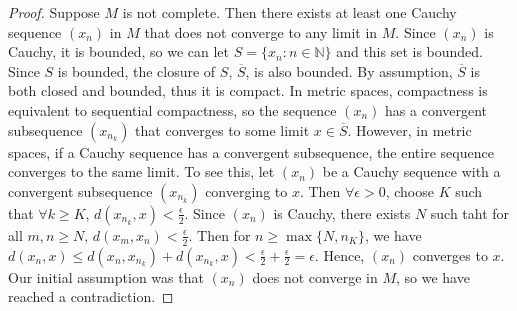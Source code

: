 \documentclass[12pt]{article}
\newcommand{\bbN}{\mathbb{N}}
\renewcommand{\_}[1]{\underline{ #1 }}
\theoremstyle{definition}
\newenvironment{exercise}[1]
  {\renewcommand\theinnercustomthm{#1}\innercustomthm}
  {\endinnercustomthm}
\numberwithin{equation}{subsection}
\begin{document}
\begin{exercise}{22}
    \begin{proof}
        Suppose $M$ is not complete. Then there exists at least one Cauchy sequence $(x_n)$ in $M$ that does not converge to any limit in $M$. Since $(x_n)$ is Cauchy, it is bounded, so we can let $S = \{ x_n : n \in \bbN \}$ and this set is bounded. Since $S$ is bounded, the closure of $S$, $\overline{S}$, is also bounded. By assumption, $\overline{S}$ is both closed and bounded, thus it is compact. In metric spaces, compactness is equivalent to sequential compactness, so the sequence $(x_n)$ has a convergent subsequence $(x_{n_k})$ that converges to some limit $x \in \overline{S}$. However, in metric spaces, if a Cauchy sequence has a convergent subsequence, the entire sequence converges to the same limit. To see this, let $(x_n)$ be a Cauchy sequence with a convergent subsequence $(x_{n_k})$ converging to $x$. Then $\forall \epsilon > 0$, choose $K$ such that $\forall k \ge K$, $d(x_{n_k}, x) < \frac{\epsilon}{2}$. Since $(x_n)$ is Cauchy, there exists $N$ such taht for all $m, n \ge N$, $d(x_m, x_n) < \frac{\epsilon}{2}$. Then for $n \ge \max \{N, n_K \}$, we have $d(x_n, x) \le d(x_n, x_{n_k}) + d(x_{n_k}, x) < \frac{\epsilon}{2} + \frac{\epsilon}{2} = \epsilon$. Hence, $(x_n)$ converges to $x$. Our initial assumption was that $(x_n)$ does not converge in $M$, so we have reached a contradiction. 
    \end{proof}
\end{exercise}
\end{document}
